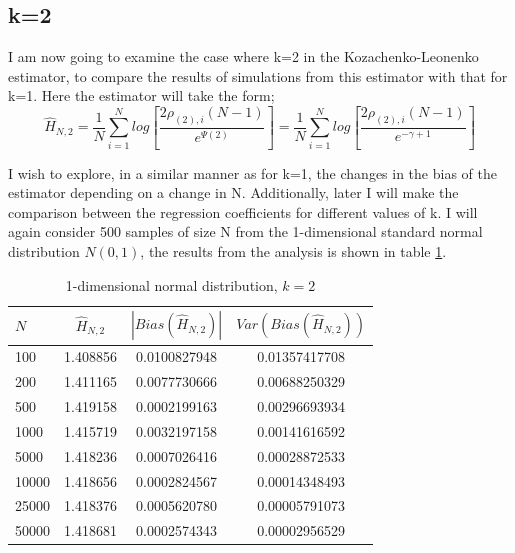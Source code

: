 \documentclass{report}
\begin{document}
\subsection{k=2} \label{N_k=2}
I am now going to examine the case where k=2 in the Kozachenko-Leonenko estimator, to compare the results of simulations from this estimator with that for k=1. Here the estimator will take the form;
\begin{equation}
\hat{H}_{N, 2} = \frac{1}{N} \sum_{i=1}^{N} log \left[ \frac{2\rho_{(2),i} (N-1)}{e^{\Psi(2)}} \right] = \frac{1}{N} \sum_{i=1}^{N} log \left[ \frac{2\rho_{(2),i} (N-1)}{e^{-\gamma + 1}} \right] \nonumber
\end{equation}

I wish to explore, in a similar manner as for k=1, the changes in the bias of the estimator depending on a change in N. Additionally, later I will make the comparison between the regression coefficients for different values of k. I will again consider 500 samples of size N from the 1-dimensional standard normal distribution $N(0, 1)$, the results from the analysis is shown in table \ref{normal_k=2_table}.

\begin{table}
\caption{1-dimensional normal distribution, $k=2$} \label{normal_k=2_table}
\begin{center}
\begin{tabular}{| l | c c c|} 
\toprule
$N$ & $\hat{H}_{N, 2}$ & $|Bias(\hat{H}_{N, 2})|$ & $Var(Bias(\hat{H}_{N, 2}))$ \\
\midrule[1pt]
100     & 1.408856     & 0.0100827948     & 0.01357417708  \\
200     & 1.411165     & 0.0077730666     & 0.00688250329  \\
500     & 1.419158     & 0.0002199163     & 0.00296693934  \\
1000    & 1.415719     & 0.0032197158     & 0.00141616592  \\
5000    & 1.418236     & 0.0007026416     & 0.00028872533  \\
10000   & 1.418656     & 0.0002824567     & 0.00014348493  \\
25000   & 1.418376     & 0.0005620780     & 0.00005791073  \\
50000   & 1.418681     & 0.0002574343     & 0.00002956529  \\
\hline
\end{tabular}
\end{center}
\end{table}
\end{document}
